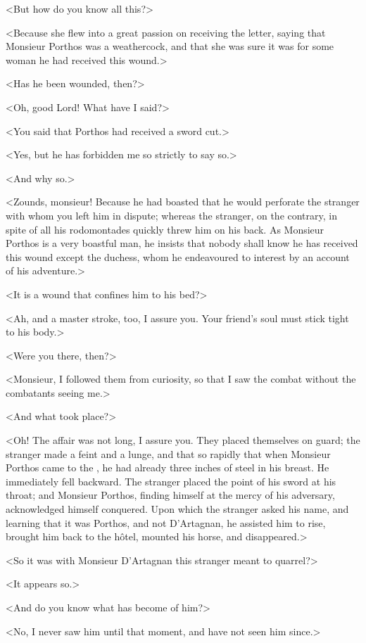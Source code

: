 <But how do you know all this?> 

<Because she flew into a great passion on receiving the letter, saying that Monsieur Porthos was a weathercock, and that she was sure it was for some woman he had received this wound.> 

<Has he been wounded, then?> 

<Oh, good Lord! What have I said?> 

<You said that Porthos had received a sword cut.> 

<Yes, but he has forbidden me so strictly to say so.> 

<And why so.> 

<Zounds, monsieur! Because he had boasted that he would perforate the stranger with whom you left him in dispute; whereas the stranger, on the contrary, in spite of all his rodomontades quickly threw him on his back. As Monsieur Porthos is a very boastful man, he insists that nobody shall know he has received this wound except the duchess, whom he endeavoured to interest by an account of his adventure.> 

<It is a wound that confines him to his bed?> 

<Ah, and a master stroke, too, I assure you. Your friend's soul must stick tight to his body.> 

<Were you there, then?> 

<Monsieur, I followed them from curiosity, so that I saw the combat without the combatants seeing me.> 

<And what took place?> 

<Oh! The affair was not long, I assure you. They placed themselves on guard; the stranger made a feint and a lunge, and that so rapidly that when Monsieur Porthos came to the , he had already three inches of steel in his breast. He immediately fell backward. The stranger placed the point of his sword at his throat; and Monsieur Porthos, finding himself at the mercy of his adversary, acknowledged himself conquered. Upon which the stranger asked his name, and learning that it was Porthos, and not D'Artagnan, he assisted him to rise, brought him back to the hôtel, mounted his horse, and disappeared.> 

<So it was with Monsieur D'Artagnan this stranger meant to quarrel?> 

<It appears so.> 

<And do you know what has become of him?> 

<No, I never saw him until that moment, and have not seen him since.> 

